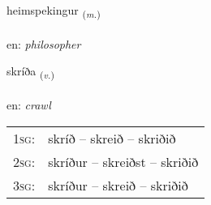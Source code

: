 \documentclass[frontgrid, backgrid]{flacards}\usepackage[]{graphicx}\usepackage[]{xcolor}
\begin{document}
\renewcommand{\flhead}{\vskip5pt \fboxsep=0pt {\small\bfseries\footnotesize Nafnorð | Noun}}
\renewcommand{\fcfoot}{\vskip5pt \fboxsep=0pt \hspace{2pt}{\small\bfseries\footnotesize 3K}}

\renewcommand{\blhead}{\vskip5pt {\small\bfseries\footnotesize Nafnorð | Noun }}
\renewcommand{\bcfoot}{\vskip5pt \hspace{2pt}{\small\bfseries\footnotesize 3K}}


{heimspekingur \small{\textsubscript{(\textit{m.})}} \\[1ex] %
\textphonetic{[heimspɛciŋkʏr]} \\
en: \emph{philosopher} \\  [2ex]
\renewcommand*{\arraystretch}{0.8}
}

\renewcommand{\flhead}{\vskip5pt \fboxsep=0pt {\small\bfseries\footnotesize Sagnorð | Verb}}
\renewcommand{\fcfoot}{\vskip5pt \fboxsep=0pt \hspace{2pt}{\small\bfseries\footnotesize 3K}}

\renewcommand{\blhead}{\vskip5pt {\small\bfseries\footnotesize Sagnorð | Verb }}
\renewcommand{\bcfoot}{\vskip5pt \hspace{2pt}{\small\bfseries\footnotesize 3K}}


{skríða \small{\textsubscript{(\textit{v.})}} \\[1ex] %
\textphonetic{[skriːða]} \\
en: \emph{crawl} \\  [2ex]
\renewcommand*{\arraystretch}{0.8}
\begin{tabular}{p{1cm}l}
\textsc{1sg}: & skríð -- skreið -- skriðið \\ 
\textsc{2sg}: & skríður -- skreiðst -- skriðið \\ 
\textsc{3sg}: & skríður -- skreið -- skriðið \\ 
\end{tabular}
}
\end{document}
